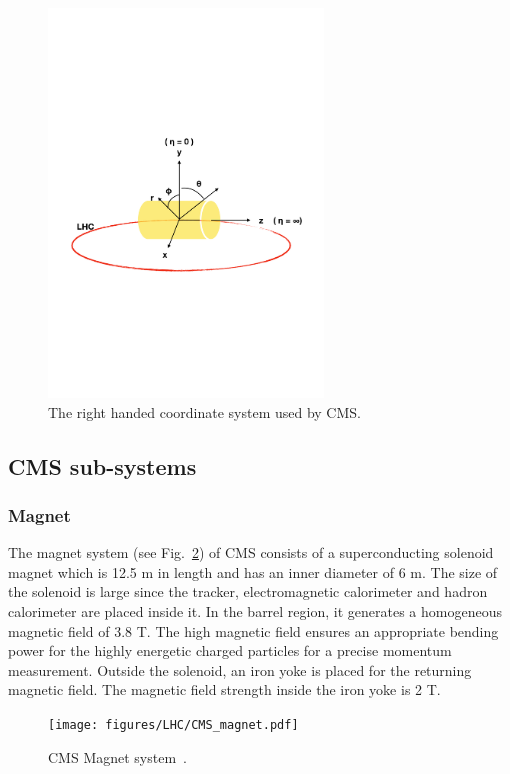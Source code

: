 \begin{figure}[!htbp]
	\centering
	\includegraphics[width=0.65\textwidth]{figures/LHC/CMS-coordinate-system.pdf}
	\caption{The right handed coordinate system used by CMS.}
	\label{fig:cms-coordinate-system}
\end{figure}

\subsection{CMS sub-systems} %
\label{sub:cms_sub_systems}

\subsubsection{Magnet} %
\label{ssub:magnet}
The magnet system (see Fig.~\ref{fig:CMS-magnet}) of CMS consists of a superconducting solenoid magnet which is 12.5 m in length and has an inner diameter of 6 m. The size of the solenoid is large since the tracker, electromagnetic calorimeter and hadron calorimeter are placed inside it. In the barrel region, it generates a homogeneous magnetic field of 3.8 T. The high magnetic field ensures an appropriate bending power for the highly energetic charged particles for a precise momentum measurement. Outside the solenoid, an iron yoke is placed for the returning magnetic field. The magnetic field strength inside the iron yoke is 2 T.
\begin{figure}[!htbp]
	\centering
	\texttt{[image: figures/LHC/CMS\_magnet.pdf]}
	\caption{CMS Magnet system~\cite{Brice2007}.}
	\label{fig:CMS-magnet}
\end{figure}

